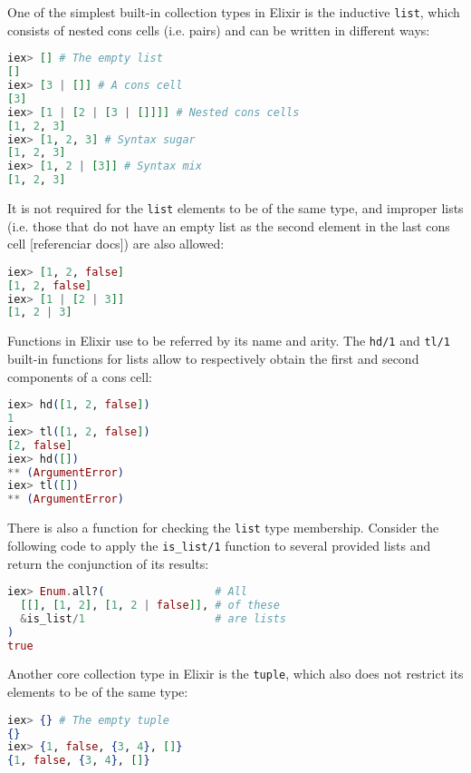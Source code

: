 One of the simplest built-in collection types in Elixir is the inductive 
\verb|list|, which consists of nested cons cells (i.e. pairs) and can be
written in different ways:

\begin{lstlisting}[language=elixir,numbers=none,frame=none]
iex> [] # The empty list 
[] 
iex> [3 | []] # A cons cell
[3]
iex> [1 | [2 | [3 | []]]] # Nested cons cells
[1, 2, 3]
iex> [1, 2, 3] # Syntax sugar
[1, 2, 3]
iex> [1, 2 | [3]] # Syntax mix
[1, 2, 3]
\end{lstlisting}

It is not required for the \verb|list| elements to be of the same type, and
improper lists (i.e. those that do not have an empty list as the second element
in the last cons cell [referenciar docs]) are also allowed:

\begin{lstlisting}[language=elixir,numbers=none,frame=none]
iex> [1, 2, false]
[1, 2, false]
iex> [1 | [2 | 3]] 
[1, 2 | 3]
\end{lstlisting}

Functions in Elixir use to be referred by its name and arity. The \verb|hd/1|
and \verb|tl/1| built-in functions for lists allow to respectively obtain the
first and second components of a cons cell:

\begin{lstlisting}[language=elixir,numbers=none,frame=none]
iex> hd([1, 2, false])
1
iex> tl([1, 2, false])
[2, false]
iex> hd([])
** (ArgumentError)
iex> tl([])
** (ArgumentError)
\end{lstlisting}

There is also a function for checking the \verb|list| type membership. Consider
the following code to apply the \verb|is_list/1| function to several provided 
lists and return the conjunction of its results:

\begin{lstlisting}[language=elixir,numbers=none,frame=none]
iex> Enum.all?(                 # All
  [[], [1, 2], [1, 2 | false]], # of these
  &is_list/1                    # are lists
)
true
\end{lstlisting}

Another core collection type in Elixir is the \verb|tuple|, which also does not
restrict its elements to be of the same type:

\begin{lstlisting}[language=elixir,numbers=none,frame=none]
iex> {} # The empty tuple
{}
iex> {1, false, {3, 4}, []}
{1, false, {3, 4}, []}
\end{lstlisting}

